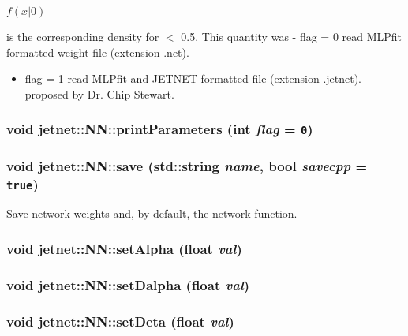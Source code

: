 $f(x|0)$

is the corresponding density for $<$ 0.5. This quantity was - flag = 0 read MLPfit formatted weight file (extension .net).\begin{itemize}
\item flag = 1 read MLPfit and JETNET formatted file (extension .jetnet). proposed by Dr. Chip Stewart. \end{itemize}
\hypertarget{classjetnet_1_1NN_a20}{
\subsubsection[printParameters]{\setlength{\rightskip}{0pt plus 5cm}void jetnet::NN::print\-Parameters (int {\em flag} = {\tt 0})}}
\label{classjetnet_1_1NN_a20}


\hypertarget{classjetnet_1_1NN_a19}{
\subsubsection[save]{\setlength{\rightskip}{0pt plus 5cm}void jetnet::NN::save (std::string {\em name}, bool {\em savecpp} = {\tt true})}}
\label{classjetnet_1_1NN_a19}


Save network weights and, by default, the network function. 

\hypertarget{classjetnet_1_1NN_a8}{
\subsubsection[setAlpha]{\setlength{\rightskip}{0pt plus 5cm}void jetnet::NN::set\-Alpha (float {\em val})}}
\label{classjetnet_1_1NN_a8}


\hypertarget{classjetnet_1_1NN_a11}{
\subsubsection[setDalpha]{\setlength{\rightskip}{0pt plus 5cm}void jetnet::NN::set\-Dalpha (float {\em val})}}
\label{classjetnet_1_1NN_a11}


\hypertarget{classjetnet_1_1NN_a12}{
\subsubsection[setDeta]{\setlength{\rightskip}{0pt plus 5cm}void jetnet::NN::set\-Deta (float {\em val})}}
\label{classjetnet_1_1NN_a12}


